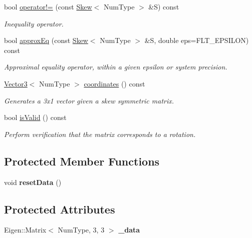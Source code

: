 \begin{DoxyCompactItemize}
bool \hyperlink{singletonscrews_1_1_skew_aba8294876f1eb8bd01cf815a6b4737a7}{operator!=} (const \hyperlink{singletonscrews_1_1_skew}{Skew}$<$ Num\+Type $>$ \&S) const 
\begin{DoxyCompactList}\small\item\em Inequality operator. \end{DoxyCompactList}\item 
bool \hyperlink{singletonscrews_1_1_skew_ac09fbcd9eb22dd64615f63970e36ac15}{approx\+Eq} (const \hyperlink{singletonscrews_1_1_skew}{Skew}$<$ Num\+Type $>$ \&S, double eps=F\+L\+T\+\_\+\+E\+P\+S\+I\+L\+O\+N) const 
\begin{DoxyCompactList}\small\item\em Approximal equality operator, within a given epsilon or system precision. \end{DoxyCompactList}\item 
\hyperlink{singletonscrews_1_1_translation}{Vector3}$<$ Num\+Type $>$ \hyperlink{singletonscrews_1_1_skew_a4d47298ff6bcfb3a80989bf9bb39796f}{coordinates} () const 
\begin{DoxyCompactList}\small\item\em Generates a 3x1 vector given a skew symmetric matrix. \end{DoxyCompactList}\item 
bool \hyperlink{singletonscrews_1_1_skew_a48c651638f00597c1b66cac30b0b9981}{is\+Valid} () const 
\begin{DoxyCompactList}\small\item\em Perform verification that the matrix corresponds to a rotation. \end{DoxyCompactList}\end{DoxyCompactItemize}
\subsection*{Protected Member Functions}
\begin{DoxyCompactItemize}
\item 
\hypertarget{singletonscrews_1_1_skew_ab7c0885cd2c1a3400af71af202367e52}{void {\bfseries reset\+Data} ()}\label{singletonscrews_1_1_skew_ab7c0885cd2c1a3400af71af202367e52}

\end{DoxyCompactItemize}
\subsection*{Protected Attributes}
\begin{DoxyCompactItemize}
\item 
\hypertarget{singletonscrews_1_1_skew_a99cbbe9cb3fa347139803350d445171c}{Eigen\+::\+Matrix$<$ Num\+Type, 3, 3 $>$ {\bfseries \+\_\+data}}\label{singletonscrews_1_1_skew_a99cbbe9cb3fa347139803350d445171c}

\end{DoxyCompactItemize}
